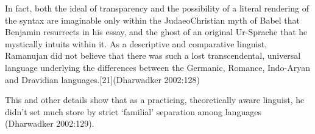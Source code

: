 \begin{myquote}
In fact, both the ideal of transparency and the possibility of a literal rendering of the syntax are imaginable only within the JudaeoChristian myth of Babel that Benjamin resurrects in his essay, and the ghost of an original Ur-Sprache that he mystically intuits within it. As a descriptive and comparative linguist, Ramanujan did not believe that there was such a lost transcendental, universal language underlying the differences between the Germanic, Romance, Indo-Aryan and Dravidian languages.[21]\hfill (Dharwadker 2002:128)
\end{myquote}

This and other details show that as a practicing, theoretically aware linguist, he didn’t set much store by strict ‘familial’ separation among languages (Dharwadker 2002:129).

